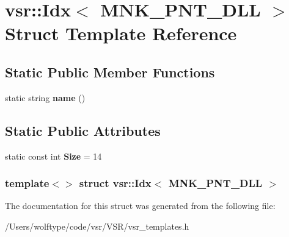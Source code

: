 \hypertarget{structvsr_1_1_idx_3_01_m_n_k___p_n_t___d_l_l_01_4}{\section{vsr\-:\-:Idx$<$ M\-N\-K\-\_\-\-P\-N\-T\-\_\-\-D\-L\-L $>$ Struct Template Reference}
\label{structvsr_1_1_idx_3_01_m_n_k___p_n_t___d_l_l_01_4}
}
\subsection*{Static Public Member Functions}
\begin{DoxyCompactItemize}
\item 
\hypertarget{structvsr_1_1_idx_3_01_m_n_k___p_n_t___d_l_l_01_4_a03027652367625e670982b36c3ecd19a}{static string {\bfseries name} ()}\label{structvsr_1_1_idx_3_01_m_n_k___p_n_t___d_l_l_01_4_a03027652367625e670982b36c3ecd19a}

\end{DoxyCompactItemize}
\subsection*{Static Public Attributes}
\begin{DoxyCompactItemize}
\item 
\hypertarget{structvsr_1_1_idx_3_01_m_n_k___p_n_t___d_l_l_01_4_a4987761a9bb5f2baca059a8a829ebadb}{static const int {\bfseries Size} = 14}\label{structvsr_1_1_idx_3_01_m_n_k___p_n_t___d_l_l_01_4_a4987761a9bb5f2baca059a8a829ebadb}

\end{DoxyCompactItemize}
\subsubsection*{template$<$$>$ struct vsr\-::\-Idx$<$ M\-N\-K\-\_\-\-P\-N\-T\-\_\-\-D\-L\-L $>$}



The documentation for this struct was generated from the following file\-:\begin{DoxyCompactItemize}
\item 
/\-Users/wolftype/code/vsr/\-V\-S\-R/vsr\-\_\-templates.\-h\end{DoxyCompactItemize}
